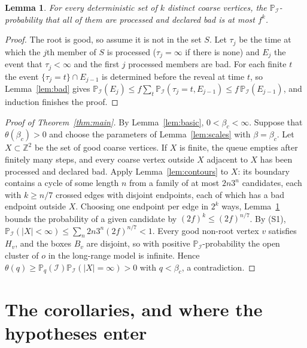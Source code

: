 \documentclass[11pt]{article}
\newtheorem{lemma}[theorem]{Lemma}
\theoremstyle{definition}
\theoremstyle{remark}
\numberwithin{equation}{section}
\newcommand{\Z}{\mathbb Z}
\newcommand{\Pp}{\mathbb P}
\newcommand{\1}{\mathbf 1}
\newcommand{\cI}{\mathcal I}
\begin{document}
\begin{lemma}\label{lem:badset}
For every deterministic set of $k$ distinct coarse vertices, the $\Pp_\cI$-probability that all of
them are processed and declared bad is at most $f^k$.
\end{lemma}
\begin{proof}
The root is good, so assume it is not in the set $S$. Let $\tau_j$ be the time at which the $j$th
member of $S$ is processed ($\tau_j=\infty$ if there is none) and $E_j$ the event that $\tau_j<\infty$
and the first $j$ processed members are bad. For each finite $t$ the event
$\{\tau_j=t\}\cap E_{j-1}$ is determined before the reveal at time $t$, so Lemma~\ref{lem:bad} gives
$\Pp_\cI(E_j)\le f\sum_t\Pp_\cI(\tau_j=t,E_{j-1})\le f\,\Pp_\cI(E_{j-1})$, and induction finishes the proof.
\end{proof}

\begin{proof}[Proof of Theorem~\ref{thm:main}]
By Lemma~\ref{lem:basic}, $0<\beta_c<\infty$. Suppose that $\theta(\beta_c)>0$ and choose the
parameters of Lemma~\ref{lem:scales} with $\beta=\beta_c$. Let $X\subset\Z^2$ be the set of good coarse
vertices. If $X$ is finite, the queue empties after finitely many steps, and every coarse vertex
outside $X$ adjacent to $X$ has been processed and declared bad. Apply Lemma~\ref{lem:contours} to
$X$: its boundary contains a cycle of some length $n$ from a family of at most $2n3^n$ candidates,
each with $k\ge n/7$ crossed edges with disjoint endpoints, each of which has a bad endpoint outside
$X$. Choosing one endpoint per edge in $2^k$ ways, Lemma~\ref{lem:badset} bounds the probability of a
given candidate by $(2f)^k\le(2f)^{n/7}$. By (S1),
$\Pp_\cI(|X|<\infty)\le\sum_n2n3^n(2f)^{n/7}<1$. Every good non-root vertex $v$ satisfies $H_v$, and
the boxes $B_v$ are disjoint, so with positive $\Pp_\cI$-probability the open cluster of $o$ in the
long-range model is infinite. Hence $\theta(q)\ge\Pp_q(\cI)\Pp_\cI(|X|=\infty)>0$ with $q<\beta_c$,
a contradiction.
\end{proof}

\section{The corollaries, and where the hypotheses enter}\label{sec:corollaries}
\end{document}

